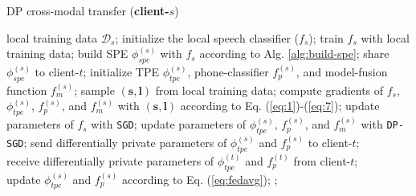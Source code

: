 \documentclass[11pt]{article}
\begin{document}
\begin{algorithm}[!htp]
\caption{DP cross-modal transfer (\textbf{client-$s$})}
\label{alg:s-side}
\small
\begin{algorithmic}[1]
    \Require local training data $\mathcal{D}_s$;
    \State initialize the local speech classifier (${f}_{s}$);
    \State train ${f}_{s}$ with local training data;
    \State  build SPE ${\phi}_{spe}^{(s)}$ with ${f}_{s}$ according to Alg. \ref{alg:build-spe};
    \State  share ${\phi}_{spe}^{(s)}$ to client-$t$;
    \State initialize TPE ${\phi}_{tpe}^{(s)}$, phone-classifier ${f}_{p}^{(s)}$, and model-fusion function ${f}_m^{(s)}$;
            \State sample $(\mathbf{s}, \mathbf{l})$ from local training data;
            \State compute gradients of ${f}_{s}$, ${\phi}_{tpe}^{(s)}$, ${f}_{p}^{(s)}$, and ${f}_m^{(s)}$ with $(\mathbf{s}, \mathbf{l})$ according to Eq. (\ref{eq:1})-(\ref{eq:7});
            \State update parameters of ${f}_{s}$ with \texttt{SGD};
            \State update parameters of ${\phi}_{tpe}^{(s)}$, ${f}_{p}^{(s)}$, and ${f}_m^{(s)}$ with \texttt{DP-SGD};
        \EndFor
        \State send differentially private parameters of ${\phi}_{tpe}^{(s)}$ and ${f}_{p}^{(s)}$ to client-$t$; \\
        \State receive differentially private parameters of ${\phi}_{tpe}^{(t)}$ and ${f}_{p}^{(t)}$ from client-$t$; \\
        \State update ${\phi}_{tpe}^{(s)}$ and ${f}_{p}^{(s)}$ according to Eq. (\ref{eq:fedavg});
    \EndWhile
    ;
\end{algorithmic}
\end{algorithm} %
\end{document}
